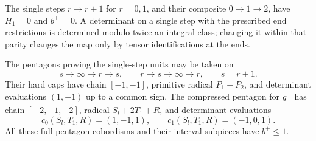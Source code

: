 \begin{lemma}
\label{lem:ordinary:unit-topology}
The single steps $r\to r+1$ for $r=0,1$, and their composite
$0\to1\to2$, have $H_1=0$ and $b^+=0$.  A determinant on a single
step with the prescribed end restrictions is determined modulo
twice an integral class; changing it within that parity changes
the map only by tensor identifications at the ends.

The pentagons proving the single-step units may be taken on
\begin{equation}\label{eq:ordinary:two-triples}
 s\to\infty\to r\to s,
 \qquad r\to s\to\infty\to r,
 \qquad s=r+1.
\end{equation}
Their hard caps have chain $[-1,-1]$, primitive radical
$P_1+P_2$, and determinant evaluations $(1,-1)$ up to a common
sign.  The compressed pentagon for $g_+$ has chain
$[-2,-1,-2]$, radical $S_l+2T_1+R$, and determinant evaluations
\begin{equation}\label{eq:ordinary:hard-determinants}
 c_0(S_l,T_1,R)=(1,-1,1),
 \qquad c_1(S_l,T_1,R)=(-1,0,1).
\end{equation}
All these full pentagon cobordisms and their interval subpieces
have $b^+\le1$.
\end{lemma}
